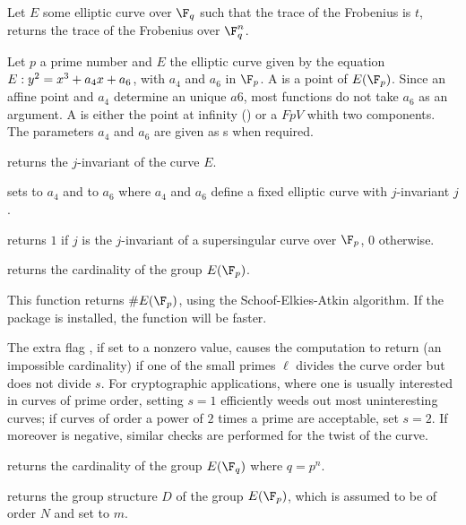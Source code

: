 
 Let $E$ some elliptic curve
over $\F_q$ such that the trace of the Frobenius is $t$, returns the trace of
the Frobenius over $\F_q^n$.


Let $p$ a prime number and $E$ the elliptic curve given by the equation
$E:y^2=x^3+a_4\*x+a_6$, with $a_4$ and $a_6$ in $\F_p$. A  is a
point of $E(\F_p)$.  Since an affine point and $a_4$ determine an unique
$a6$, most functions do not take $a_6$ as an argument. A  is either
the point at infinity () or a $FpV$ whith two components. The
parameters $a_4$ and $a_6$ are given as s when required.

returns the $j$-invariant of the curve $E$.

sets  to $a_4$ and  to $a_6$ where $a_4$ and $a_6$
define a fixed elliptic curve with $j$-invariant $j$.

 returns $1$ if $j$ is the
$j$-invariant of a supersingular curve over $\F_p$, $0$ otherwise.

 returns the cardinality of the
group $E(\F_p)$.

This function returns $\#E(\F_p)$, using the Schoof-Elkies-Atkin algorithm.
If the  package is installed, the function will be faster.

The extra flag , if set to a nonzero value, causes the computation to
return  (an impossible cardinality) if one of the small primes
$\ell$ divides the curve order but does not divide $s$.
For cryptographic applications, where one is usually interested in curves of
prime order, setting $s=1$ efficiently weeds out most uninteresting curves; if
curves of order a power of $2$ times a prime are acceptable, set $s=2$.
If moreover  is negative, similar checks are performed for the
twist of the curve.

 returns the
cardinality of the group $E(\F_q)$ where $q=p^n$.

 returns the
group structure $D$ of the group $E(\F_p)$, which is assumed to be of order $N$
and set  to $m$.


